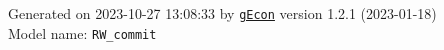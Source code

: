 \documentclass[10pt,a4paper]{article}
\numberwithin{equation}{section}
\begin{document}
\begin{landscape}
\begin{flushleft}{\large
Generated  on 2023-10-27 13:08:33 by \href{http://gecon.r-forge.r-project.org/}{\texttt{gEcon}} version 1.2.1 (2023-01-18)\\
Model name: \verb+RW_commit+
}\end{flushleft}


\end{landscape}

\end{document}
